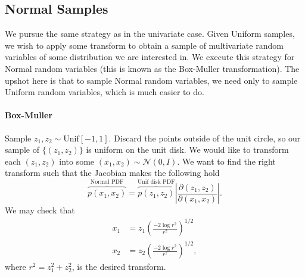 \documentclass{article}
\begin{document}
\subsection{Normal Samples}
We pursue the same strategy as in the univariate case. Given Uniform samples, we wish to apply some transform to obtain a sample of multivariate random variables of some distribution we are interested in. We execute this strategy for Normal random variables (this is known as the Box-Muller transformation). The upshot here is that to sample Normal random variables, we need only to sample Uniform random variables, which is much easier to do.

\paragraph{Box-Muller} Sample $z_1,z_2 \sim \text{Unif}[-1,1]$. Discard the points outside of the unit circle, so our sample of $\{(z_1,z_2)\}$ is uniform on the unit disk. We would like to transform each $(z_1,z_2)$ into some $(x_1,x_2) \sim \mathcal N(0,I)$. We want to find the right transform such that the Jacobian makes the following hold \[
\overbrace{p(x_1,x_2)}^{\text{Normal PDF}} = \overbrace{p(z_1,z_2)}^{\text{Unif disk PDF}} \left|\frac{\partial(z_1,z_2)}{\partial(x_1,x_2)}\right|.
\]
We may check that \begin{align*}
x_1 &= z_1 \left({\frac{-2\log r^2}{r^2}}\right)^{1/2}\\
x_2 &= z_2 \left({\frac{-2\log r^2}{r^2}}\right)^{1/2},
\end{align*}
where $r^2 = z_1^2 + z_2^2$, is the desired transform.







\end{document}

